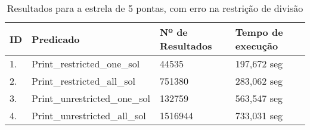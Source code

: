 \begin{table}[]
\caption{Resultados para a estrela de 5 pontas, com erro na restrição de divisão}
\label{tab:div_error}
\centering
\begin{tabular}{llll}
\hline
ID & Predicado                     & Nº de Resultados & Tempo de execução \\ \hline\hline
1. & Print\_restricted\_one\_sol   & 44535            & 197,672 seg       \\
2. & Print\_restricted\_all\_sol   & 751380           & 283,062 seg       \\
3. & Print\_unrestricted\_one\_sol & 132759           & 563,547 seg       \\
4. & Print\_unrestricted\_all\_sol & 1516944          & 733,031 seg       \\ \hline  
\end{tabular}
\end{table}